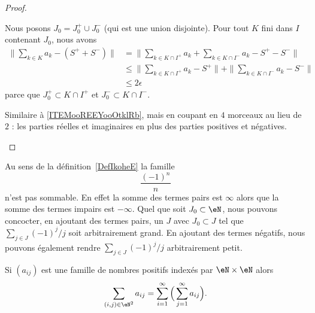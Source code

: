 \begin{proof}
\begin{subproof}
		Nous posons \( J_0=J_0^+\cup J_0^-\) (qui est une union disjointe). Pour tout \( K\) fini dans \( I\) contenant \( J_0\), nous avons
		\begin{subequations}
			\begin{align}
				\| \sum_{k\in K}a_k-(S^++S^-) \| & =\| \sum_{k\in K\cap I^+}a_k+\sum_{k\in K\cap I^-}a_k-S^+-S^- \|          \\
				                                 & \leq\| \sum_{k\in K\cap I^+}a_k-S^+ \|+\| \sum_{k\in K\cap I^-}a_k-S^- \| \\
				                                 & \leq 2\epsilon
			\end{align}
		\end{subequations}
		parce que \( J_0^+\subset K\cap I^+\) et \( J_0^-\subset K\cap I^-\).

		Similaire à \ref{ITEMooREEYooOtklRb}, mais en coupant en $4$ morceaux au lieu de \( 2\) : les parties réelles et imaginaires en plus des parties positives et négatives.
	\end{subproof}
\end{proof}

\begin{example}     \label{EXooULLXooTDFYqf}
	Au sens de la définition~\ref{DefIkoheE} la famille
	\begin{equation}
		\frac{ (-1)^n }{ n }
	\end{equation}
	n'est pas sommable. En effet la somme des termes pairs est \( \infty\) alors que la somme des termes impairs est \( -\infty\). Quel que soit \( J_0\subset \eN\), nous pouvons concocter, en ajoutant des termes pairs, un \( J\) avec \( J_0\subset J\) tel que \( \sum_{j\in J}(-1)^j/j\) soit arbitrairement grand. En ajoutant des termes négatifs, nous pouvons également rendre \( \sum_{j\in J}(-1)^j/j\) arbitrairement petit.
\end{example}

\begin{proposition} \label{PropVQCooYiWTs}
	Si \( (a_{ij})\) est une famille de nombres positifs indexés par \( \eN\times \eN\) alors
	\begin{equation}
		\sum_{(i,j)\in \eN^2}a_{ij}=\sum_{i=1}^{\infty}\Big( \sum_{j=1}^{\infty}a_{ij} \Big).
	\end{equation}
\end{proposition}

